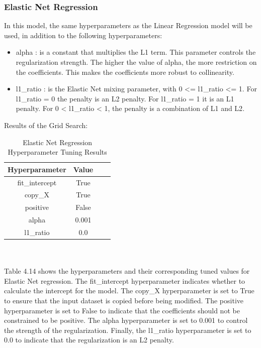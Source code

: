 \documentclass{report}
\begin{document}
\subsubsection{Elastic Net Regression}
In this model, the same hyperparameters as the Linear Regression model will be used, in addition to the following hyperparameters:
\begin{itemize}
    \item alpha : is a constant that multiplies the L1 term. This parameter controls the regularization strength. The higher the value of alpha, the more restriction on the coefficients. This makes the coefficients more robust to collinearity\cite{scikit-learn}. 
    \item l1\_ratio : is the Elastic Net mixing parameter, with 0 <= l1\_ratio <= 1. For l1\_ratio = 0 the penalty is an L2 penalty. For l1\_ratio = 1 it is an L1 penalty. For 0 < l1\_ratio < 1, the penalty is a combination of L1 and L2\cite{scikit-learn}. 
\end{itemize}
Results of the Grid Search:
\begin{table}[h]
\centering
\begin{tabular}{|c|c|c|c|}
\hline
\textbf{Hyperparameter} & \textbf{Value} \\ \hline
fit\_intercept & True \\ \hline
copy\_X & True \\ \hline
positive & False \\ \hline
alpha & 0.001 \\ \hline
l1\_ratio & 0.0 \\ \hline
\end{tabular}
\caption{Elastic Net Regression Hyperparameter Tuning Results}
\end{table}\\
\\
Table 4.14 shows the hyperparameters and their corresponding tuned values for Elastic Net regression. The fit\_intercept hyperparameter indicates whether to calculate the intercept for the model. The copy\_X hyperparameter is set to True to ensure that the input dataset is copied before being modified. The positive hyperparameter is set to False to indicate that the coefficients should not be constrained to be positive. The alpha hyperparameter is set to 0.001 to control the strength of the regularization. Finally, the l1\_ratio hyperparameter is set to 0.0 to indicate that the regularization is an L2 penalty.
\end{document}
